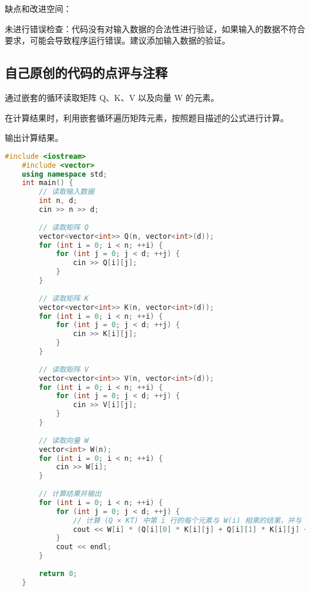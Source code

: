 缺点和改进空间：

未进行错误检查：代码没有对输入数据的合法性进行验证，如果输入的数据不符合要求，可能会导致程序运行错误。建议添加输入数据的验证。

\subsection{自己原创的代码的点评与注释}

通过嵌套的循环读取矩阵 Q、K、V 以及向量 W 的元素。

在计算结果时，利用嵌套循环遍历矩阵元素，按照题目描述的公式进行计算。

输出计算结果。

\begin{lstlisting}[language=C++]
    #include <iostream>
    #include <vector>
    using namespace std;
    int main() {
        // 读取输入数据
        int n, d;
        cin >> n >> d;
    
        // 读取矩阵 Q
        vector<vector<int>> Q(n, vector<int>(d));
        for (int i = 0; i < n; ++i) {
            for (int j = 0; j < d; ++j) {
                cin >> Q[i][j];
            }
        }
    
        // 读取矩阵 K
        vector<vector<int>> K(n, vector<int>(d));
        for (int i = 0; i < n; ++i) {
            for (int j = 0; j < d; ++j) {
                cin >> K[i][j];
            }
        }
    
        // 读取矩阵 V
        vector<vector<int>> V(n, vector<int>(d));
        for (int i = 0; i < n; ++i) {
            for (int j = 0; j < d; ++j) {
                cin >> V[i][j];
            }
        }
    
        // 读取向量 W
        vector<int> W(n);
        for (int i = 0; i < n; ++i) {
            cin >> W[i];
        }
    
        // 计算结果并输出
        for (int i = 0; i < n; ++i) {
            for (int j = 0; j < d; ++j) {
                // 计算 (Q × KT) 中第 i 行的每个元素与 W(i) 相乘的结果，并与 V 相乘
                cout << W[i] * (Q[i][0] * K[i][j] + Q[i][1] * K[i][j] + Q[i][2] * K[i][j]) * V[i][j] << " ";
            }
            cout << endl;
        }
    
        return 0;
    }    
\end{lstlisting}